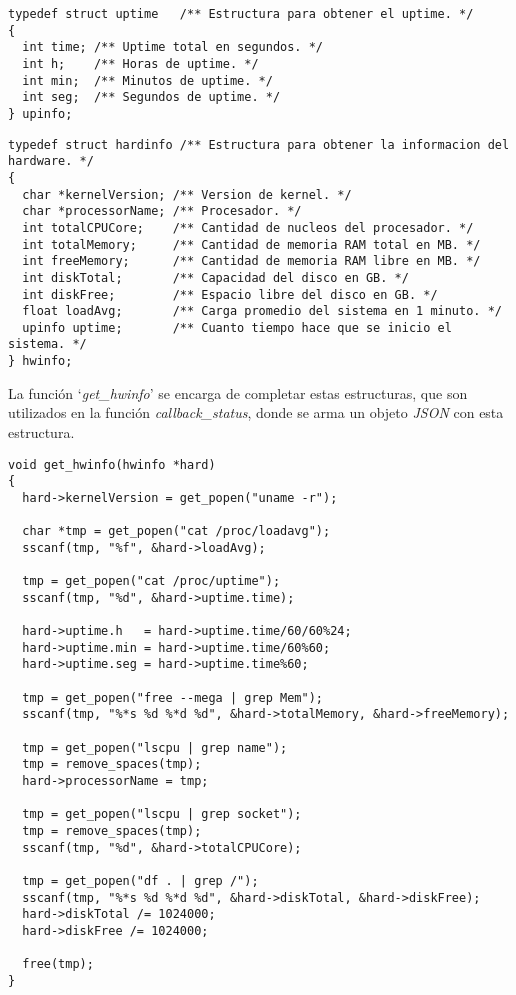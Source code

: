 \documentclass[12pt,a4paper]{article}
\begin{document}
\begin{lstlisting}[caption={Estructura `\emph{upinfo}'.}, label={up}, language=Ce]
typedef struct uptime   /** Estructura para obtener el uptime. */
{
  int time; /** Uptime total en segundos. */
  int h;    /** Horas de uptime. */
  int min;  /** Minutos de uptime. */
  int seg;  /** Segundos de uptime. */
} upinfo;
\end{lstlisting}

\begin{lstlisting}[caption={Estructura `\emph{hwinfo}'.}, label={hwinfo}, language=Ce]
typedef struct hardinfo /** Estructura para obtener la informacion del hardware. */
{
  char *kernelVersion; /** Version de kernel. */
  char *processorName; /** Procesador. */
  int totalCPUCore;    /** Cantidad de nucleos del procesador. */
  int totalMemory;     /** Cantidad de memoria RAM total en MB. */
  int freeMemory;      /** Cantidad de memoria RAM libre en MB. */
  int diskTotal;       /** Capacidad del disco en GB. */
  int diskFree;        /** Espacio libre del disco en GB. */
  float loadAvg;       /** Carga promedio del sistema en 1 minuto. */
  upinfo uptime;       /** Cuanto tiempo hace que se inicio el sistema. */
} hwinfo;
\end{lstlisting}

La función `\emph{get\_hwinfo}' se encarga de completar estas estructuras, que
son utilizados en la función \emph{callback\_status}, donde se arma un objeto
\emph{JSON} con esta estructura.

\begin{lstlisting}[caption={Función `\emph{get\_hwinfo}'.}, label={gethw}, language=Ce]
void get_hwinfo(hwinfo *hard)
{
  hard->kernelVersion = get_popen("uname -r");

  char *tmp = get_popen("cat /proc/loadavg");
  sscanf(tmp, "%f", &hard->loadAvg);

  tmp = get_popen("cat /proc/uptime");
  sscanf(tmp, "%d", &hard->uptime.time);

  hard->uptime.h   = hard->uptime.time/60/60%24;
  hard->uptime.min = hard->uptime.time/60%60;
  hard->uptime.seg = hard->uptime.time%60;

  tmp = get_popen("free --mega | grep Mem");
  sscanf(tmp, "%*s %d %*d %d", &hard->totalMemory, &hard->freeMemory);

  tmp = get_popen("lscpu | grep name");
  tmp = remove_spaces(tmp);
  hard->processorName = tmp;

  tmp = get_popen("lscpu | grep socket");
  tmp = remove_spaces(tmp);
  sscanf(tmp, "%d", &hard->totalCPUCore);

  tmp = get_popen("df . | grep /");
  sscanf(tmp, "%*s %d %*d %d", &hard->diskTotal, &hard->diskFree);
  hard->diskTotal /= 1024000;
  hard->diskFree /= 1024000;

  free(tmp);
}
\end{lstlisting}
\end{document}
